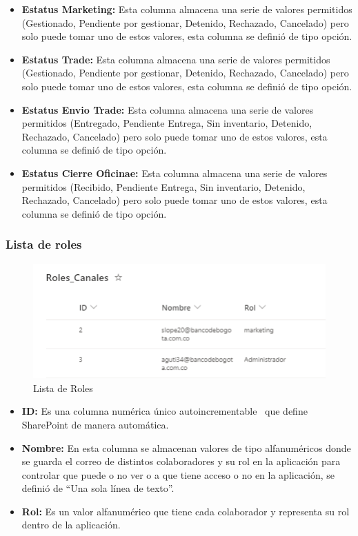 \begin{itemize}
	\item \textbf{Estatus Marketing: }Esta columna almacena una serie de valores permitidos (Gestionado, Pendiente por gestionar, Detenido, Rechazado, Cancelado) pero solo puede tomar uno de estos valores, esta columna se definió de tipo opción.
	\item \textbf{Estatus Trade: }Esta columna almacena una serie de valores permitidos (Gestionado, Pendiente por gestionar, Detenido, Rechazado, Cancelado) pero solo puede tomar uno de estos valores, esta columna se definió de tipo opción.
	\item \textbf{Estatus Envio Trade: }Esta columna almacena una serie de valores permitidos (Entregado, Pendiente Entrega, Sin inventario, Detenido, Rechazado, Cancelado) pero solo puede tomar uno de estos valores, esta columna se definió de tipo opción.
	\item \textbf{Estatus Cierre Oficinae: }Esta columna almacena una serie de valores permitidos (Recibido, Pendiente Entrega, Sin inventario, Detenido, Rechazado, Cancelado) pero solo puede tomar uno de estos valores, esta columna se definió de tipo opción.
\end{itemize}

\subsubsection{Lista de roles}
\begin{figure}[H]
	\centering
	\includegraphics[scale=0.5]{Capitulo4/imagenes/17.png}
	\caption{Lista de Roles}
	\label{LRoles}
\end{figure}

\begin{itemize}
	\item \textbf{ID: }Es una columna numérica  único autoincrementable  que define SharePoint de manera automática.
	\item \textbf{Nombre: } En esta columna se almacenan valores de tipo alfanuméricos donde se guarda el correo de distintos colaboradores y su rol en la aplicación para controlar que puede o no ver o a que tiene acceso o no en la aplicación, se definió de ``Una sola línea de texto''.
	\item \textbf{Rol: }Es un valor alfanumérico que tiene cada colaborador y representa su rol dentro de la aplicación.
\end{itemize}


